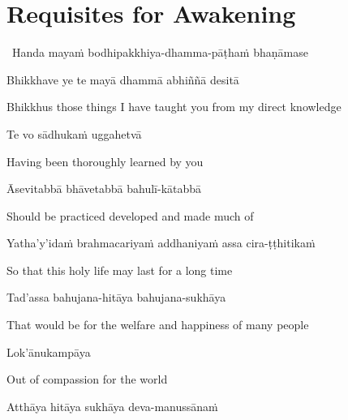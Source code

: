 \section{Requisites for Awakening}
\label{requisites-for-awakening}

\begin{leader}
  \anglebracketleft\ \hspace{-0.5mm}Handa mayaṁ bodhipakkhiya-dhamma-pāṭhaṁ bhaṇāmase \hspace{-0.5mm}\anglebracketright\
\end{leader}

Bhikkhave ye te mayā dhammā abhiññā desitā

\begin{english-hang}
  Bhikkhus those things I have taught you from my direct knowledge
\end{english-hang}

Te vo sādhukaṁ uggahetvā

\begin{english}
  Having been thoroughly learned by you
\end{english}

Āsevitabbā bhāvetabbā bahulī-kātabbā

\begin{english}
  Should be practiced developed and made much of
\end{english}

\begin{pali-hang}
Yatha'y'idaṁ brahmacariyaṁ addhaniyaṁ assa cira-ṭṭhitikaṁ
\end{pali-hang}

\begin{english}
  So that this holy life may last for a long time
\end{english}

Tad'assa bahujana-hitāya bahujana-sukhāya

\begin{english-hang}
  That would be for the welfare and happiness of many people
\end{english-hang}

Lok'ānukampāya

\begin{english}
  Out of compassion for the world
\end{english}

\ifninebythirteen\clearpage\fi

Atthāya hitāya sukhāya deva-manussānaṁ

